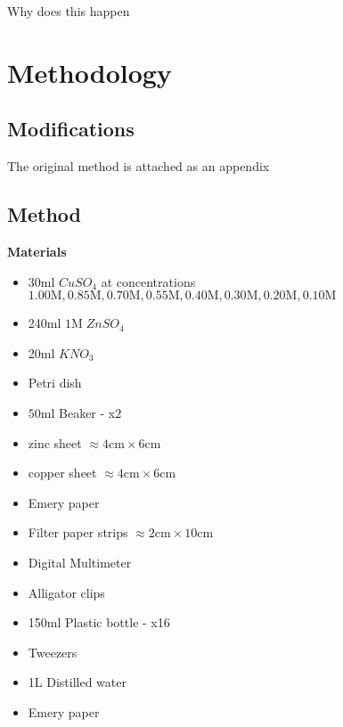 \documentclass[11pt,a4paper]{article}
\begin{document}
	Why does this happen


\section{Methodology}
\subsection{Modifications}
The original method is attached as an appendix
\subsection{Method}
\textbf{Materials}
\begin{itemize}
	\item 30ml $CuSO_4$ at concentrations $1.00\textrm{M}, 0.85\textrm{M}, 0.70\textrm{M}, 0.55\textrm{M}, 0.40\textrm{M}, 0.30\textrm{M}, 0.20\textrm{M}, 0.10\textrm{M}$
	\item 240ml $1$M$\;ZnSO_4$
	\item 20ml $KNO_3$
	\item Petri dish
	\item $50\textrm{ml}$ Beaker - x$2$
	\item zinc sheet $\approx4\textrm{cm}\times6\textrm{cm}$ 
	\item copper sheet $\approx4\textrm{cm}\times6\textrm{cm}$ 
	\item Emery paper
	\item Filter paper strips $\approx 2\textrm{cm}\times10\textrm{cm}$
	\item Digital Multimeter
	\item Alligator clips
	\item 150ml Plastic bottle - x16
	\item Tweezers 
	\item 1L Distilled water
	\item Emery paper
\end{itemize}
\end{document}
